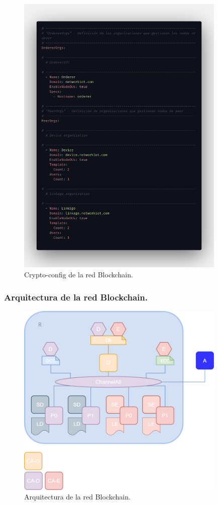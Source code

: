 \begin{figure}[ht!]
  \centering
  \includegraphics[width=10cm]{imagenes/desarrollo/crypto-config}
  \caption{Crypto-config de la red Blockchain.}
  \label{fig:crypto-config-blockchain}
\end{figure}

\subsubsection{Arquitectura de la red Blockchain.}

\begin{figure}[ht!]
  \centering
  \includegraphics[width=10cm]{imagenes/desarrollo/arquitectura_networkiot}
  \caption{Arquitectura de la red Blockchain.}
  \label{fig:arquitectura-blockchain}
\end{figure}

